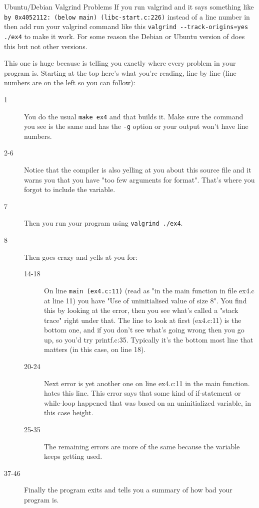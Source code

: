 \begin{aside}{Ubuntu/Debian Valgrind Problems}
If you run valgrind and it says something like \verb|by 0x4052112: (below main) (libc-start.c:226)| instead of a line number in  then add run your valgrind command like this \verb|valgrind --track-origins=yes ./ex4| to make it work.  For some reason the Debian or Ubuntu version of  does this but not
other versions.
\end{aside}

This one is huge because  is telling you exactly where
every problem in your program is.  Starting at the top here's what you're
reading, line by line (line numbers are on the left so you can follow):

\begin{description}
\item[1] You do the usual \verb|make ex4| and that builds it. Make sure the  command
    you see is the same and has the \verb|-g| option or your  output won't
    have line numbers.
\item[2-6] Notice that the compiler is also yelling at you about this source file and it
    warns you that you have "too few arguments for format".  That's where you 
    forgot to include the  variable.
\item[7] Then you run your program using \verb|valgrind ./ex4|.
\item[8] Then  goes crazy and yells at you for:
    \begin{description}
        \item[14-18] On line \verb|main (ex4.c:11)| (read as "in the main function in
            file ex4.c at line 11) you have "Use of uninitialised value of size 8".
            You find this by looking at the error, then you see what's called a "stack trace"
            right under that.  The line to look at first (ex4.c:11) is the bottom one, 
            and if you don't see what's going wrong then you go up, so you'd try
            printf.c:35.  Typically it's the bottom most line that matters (in this case, on line 18).
        \item[20-24] Next error is yet another one on line ex4.c:11 in the main function. 
            hates this line.  This error says that some kind of if-statement or while-loop
            happened that was based on an uninitialized variable, in this case height.
        \item[25-35] The remaining errors are more of the same because the variable keeps getting
        used.
    \end{description}
\item[37-46] Finally the program exits and  tells you a summary of how bad
    your program is.
\end{description}

